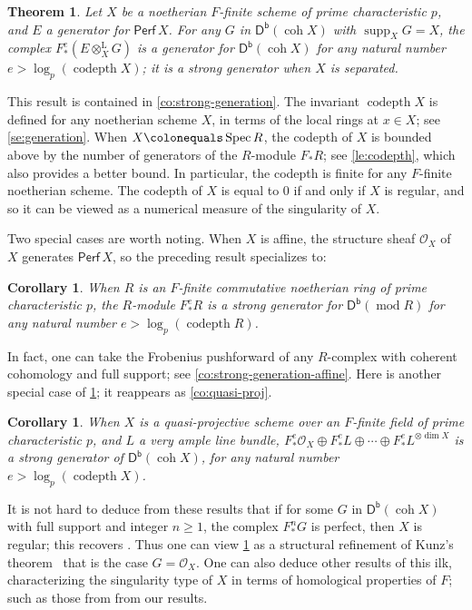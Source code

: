 \documentclass{amsart}
\newcommand{\perf}[1]{\mathsf{Perf}\,#1}
\newcommand{\coh}{\operatorname{coh}}
\newcommand{\dbcat}[1]{\cat{D}^{\mathsf{b}}(#1)}
\newcommand{\mco}{\mathcal{O}}
\newcommand{\cat}[1]{{\mathsf{#1}}}
\newcommand{\codepth}{\operatorname{codepth}}
\newcommand{\lotimes}{\otimes^{\operatorname{L}}}
\newcommand{\rmod}{\operatorname{mod}}
\newcommand{\spec}{\operatorname{Spec}}
\newcommand{\supp}{\operatorname{supp}}
\newcounter{intro}
\newtheorem{introthm}[intro]{Theorem}
\newtheorem{introcor}[intro]{Corollary}
\theoremstyle{definition}
\theoremstyle{remark}
\numberwithin{equation}{subsection}
\begin{document}
\begin{introthm}
\label{ith:general-schemes}
Let $X$ be a noetherian $F$-finite scheme of prime characteristic $p$, and $E$ a generator for $\perf X$. For any $G$ in $\dbcat{\coh X}$ with $\supp_X G=X$, the complex $F^e_*(E\lotimes_X G)$ is a generator for $\dbcat{\coh X}$ for any natural number $e> \log_p(\codepth X)$; it is a strong generator when $X$ is separated.
\end{introthm}

This result is contained in \cref{co:strong-generation}. The invariant $\codepth X$ is defined for any noetherian scheme $X$, in terms of the local rings at $x\in X$; see \cref{se:generation}. When $X\colonequals \spec R$, the codepth of $X$ is bounded above by the number of generators of the $R$-module $F _*R$; see \cref{le:codepth}, which also provides a better bound. In particular, the codepth is finite for any $F$-finite noetherian scheme. The codepth of $X$ is equal to $0$ if and only if $X$ is regular, and so it can be viewed as a numerical measure of the singularity of $X$.

Two special cases are worth noting. When $X$ is affine, the structure sheaf $\mco_X$ of $X$ generates $\perf X$, so the preceding result specializes to:

\begin{introcor}
 \label{icor:affine}
When $R$ is an $F$-finite commutative noetherian ring of prime characteristic $p$, the $R$-module $F^e_*R$ is a strong generator for $\dbcat{\rmod R}$ for any natural number $e>\log_p(\codepth R)$.
\end{introcor}

In fact, one can take the Frobenius pushforward of any $R$-complex with coherent cohomology and full support; see \cref{co:strong-generation-affine}. Here is another special case of \cref{ith:general-schemes}; it reappears as \cref{co:quasi-proj}.

\begin{introcor}
\label{icor:quasi-projective}
When $X$ is a quasi-projective scheme over an $F$-finite field of prime characteristic $p$, and $L$ a very ample line bundle, $F^e_* \mco_X \oplus F^e_* L \oplus \cdots \oplus F^e_* L^{\otimes \dim X}$ is a strong generator of $\dbcat{\coh X}$, for any natural number $e> \log_p(\codepth X)$.
\end{introcor}

It is not hard to deduce from these results that if for some $G$ in $\dbcat{\coh X}$ with full support and integer $n\ge 1$, the complex $F^n_*G$ is perfect, then $X$ is regular; this recovers \cite[Theorem~1.1]{Avramov/Hochster/Iyengar/Yao:2012}. Thus one can view \cref{ith:general-schemes} as a structural refinement of Kunz's theorem~\cite{Kunz:1969} that is the case $G=\mco_X$. One can also deduce other results of this ilk, characterizing the singularity type of $X$ in terms of homological properties of $F$; such as those from \cite{Avramov/Hochster/Iyengar/Yao:2012,Herzog:1974,Rodicio:1988,Takahashi/Yoshino:2004, Koh/Lee:1998} from our results.
\end{document}
